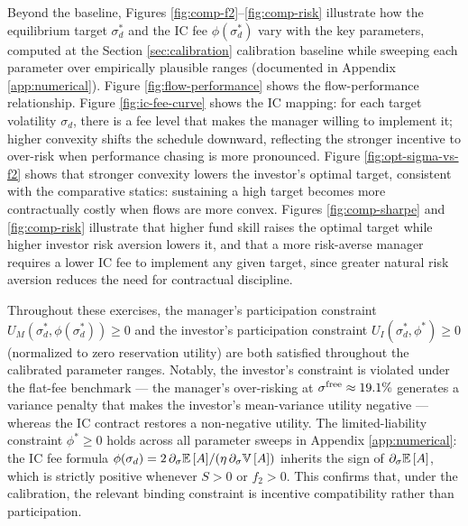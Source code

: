 Beyond the baseline, Figures \ref{fig:comp-f2}--\ref{fig:comp-risk}
illustrate how the equilibrium target \(\sigma_d^*\) and the IC fee
\(\phi(\sigma_d^*)\) vary with the key parameters, computed at the
Section \ref{sec:calibration} calibration baseline while sweeping each
parameter over empirically plausible ranges (documented in Appendix
\ref{app:numerical}). Figure \ref{fig:flow-performance} shows the
flow-performance relationship. Figure \ref{fig:ic-fee-curve} shows the
IC mapping: for each target volatility \(\sigma_d\), there is a fee
level that makes the manager willing to implement it; higher convexity
shifts the schedule downward, reflecting the stronger incentive to
over-risk when performance chasing is more pronounced. Figure
\ref{fig:opt-sigma-vs-f2} shows that stronger convexity lowers the
investor's optimal target, consistent with the comparative statics:
sustaining a high target becomes more contractually costly when flows
are more convex. Figures \ref{fig:comp-sharpe} and \ref{fig:comp-risk}
illustrate that higher fund skill raises the optimal target while higher
investor risk aversion lowers it, and that a more risk-averse manager
requires a lower IC fee to implement any given target, since greater
natural risk aversion reduces the need for contractual discipline.

Throughout these exercises, the manager's participation constraint
\(U_M(\sigma_d^*,\phi(\sigma_d^*)) \ge 0\) and the investor's
participation constraint \(U_I(\sigma_d^*,\phi^*) \ge 0\) (normalized to
zero reservation utility) are both satisfied throughout the calibrated
parameter ranges. Notably, the investor's constraint is violated under
the flat-fee benchmark --- the manager's over-risking at
\(\sigma^{\rm free}\approx 19.1\%\) generates a variance penalty that
makes the investor's mean-variance utility negative --- whereas the IC
contract restores a non-negative utility. The limited-liability
constraint \(\phi^* \ge 0\) holds across all parameter sweeps in
Appendix \ref{app:numerical}: the IC fee formula
\(\phi(\sigma_d) = 2\,\partial_\sigma {\mathbb{E}}\,[A] / (\eta\,\partial_\sigma {\mathbb{V}}\,[A])\)
inherits the sign of \(\partial_\sigma {\mathbb{E}}\,[A]\), which is strictly
positive whenever \(S > 0\) or \(f_2 > 0\). This confirms that, under
the calibration, the relevant binding constraint is incentive
compatibility rather than participation.

